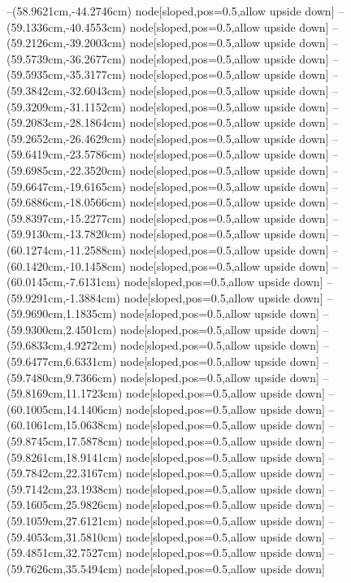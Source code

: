 --(58.9621cm,-44.2746cm) node[sloped,pos=0.5,allow upside down]{\arrowIn}
--(59.1336cm,-40.4553cm) node[sloped,pos=0.5,allow upside down]{\ArrowIn}
--(59.2126cm,-39.2003cm) node[sloped,pos=0.5,allow upside down]{\ArrowIn}
--(59.5739cm,-36.2677cm) node[sloped,pos=0.5,allow upside down]{\ArrowIn}
--(59.5935cm,-35.3177cm) node[sloped,pos=0.5,allow upside down]{\arrowIn}
--(59.3842cm,-32.6043cm) node[sloped,pos=0.5,allow upside down]{\ArrowIn}
--(59.3209cm,-31.1152cm) node[sloped,pos=0.5,allow upside down]{\ArrowIn}
--(59.2083cm,-28.1864cm) node[sloped,pos=0.5,allow upside down]{\ArrowIn}
--(59.2652cm,-26.4629cm) node[sloped,pos=0.5,allow upside down]{\ArrowIn}
--(59.6419cm,-23.5786cm) node[sloped,pos=0.5,allow upside down]{\ArrowIn}
--(59.6985cm,-22.3520cm) node[sloped,pos=0.5,allow upside down]{\ArrowIn}
--(59.6647cm,-19.6165cm) node[sloped,pos=0.5,allow upside down]{\ArrowIn}
--(59.6886cm,-18.0566cm) node[sloped,pos=0.5,allow upside down]{\ArrowIn}
--(59.8397cm,-15.2277cm) node[sloped,pos=0.5,allow upside down]{\ArrowIn}
--(59.9130cm,-13.7820cm) node[sloped,pos=0.5,allow upside down]{\ArrowIn}
--(60.1274cm,-11.2588cm) node[sloped,pos=0.5,allow upside down]{\ArrowIn}
--(60.1420cm,-10.1458cm) node[sloped,pos=0.5,allow upside down]{\ArrowIn}
--(60.0145cm,-7.6131cm) node[sloped,pos=0.5,allow upside down]{\ArrowIn}
--(59.9291cm,-1.3884cm) node[sloped,pos=0.5,allow upside down]{\ArrowIn}
--(59.9690cm,1.1835cm) node[sloped,pos=0.5,allow upside down]{\ArrowIn}
--(59.9300cm,2.4501cm) node[sloped,pos=0.5,allow upside down]{\ArrowIn}
--(59.6833cm,4.9272cm) node[sloped,pos=0.5,allow upside down]{\ArrowIn}
--(59.6477cm,6.6331cm) node[sloped,pos=0.5,allow upside down]{\ArrowIn}
--(59.7480cm,9.7366cm) node[sloped,pos=0.5,allow upside down]{\ArrowIn}
--(59.8169cm,11.1723cm) node[sloped,pos=0.5,allow upside down]{\ArrowIn}
--(60.1005cm,14.1406cm) node[sloped,pos=0.5,allow upside down]{\ArrowIn}
--(60.1061cm,15.0638cm) node[sloped,pos=0.5,allow upside down]{\arrowIn}
--(59.8745cm,17.5878cm) node[sloped,pos=0.5,allow upside down]{\ArrowIn}
--(59.8261cm,18.9141cm) node[sloped,pos=0.5,allow upside down]{\ArrowIn}
--(59.7842cm,22.3167cm) node[sloped,pos=0.5,allow upside down]{\ArrowIn}
--(59.7142cm,23.1938cm) node[sloped,pos=0.5,allow upside down]{\arrowIn}
--(59.1605cm,25.9826cm) node[sloped,pos=0.5,allow upside down]{\ArrowIn}
--(59.1059cm,27.6121cm) node[sloped,pos=0.5,allow upside down]{\ArrowIn}
--(59.4053cm,31.5810cm) node[sloped,pos=0.5,allow upside down]{\ArrowIn}
--(59.4851cm,32.7527cm) node[sloped,pos=0.5,allow upside down]{\ArrowIn}
--(59.7626cm,35.5494cm) node[sloped,pos=0.5,allow upside down]{\ArrowIn}

